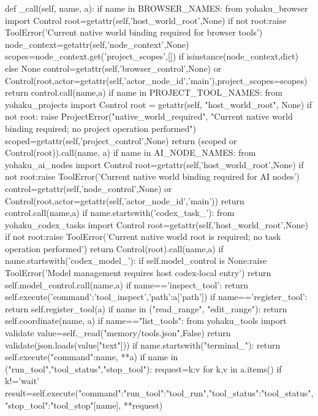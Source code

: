     def _call(self, name, a):
        if name in BROWSER_NAMES:
            from yohaku_browser import Control
            root=getattr(self,'host_world_root',None)
            if not root:raise ToolError('Current native world binding required for browser tools')
            node_context=getattr(self,'node_context',None)
            scopes=node_context.get('project_scopes',[]) if isinstance(node_context,dict) else None
            control=getattr(self,'browser_control',None) or Control(root,actor=getattr(self,'actor_node_id','main'),project_scopes=scopes)
            return control.call(name,a)
        if name in PROJECT_TOOL_NAMES:
            from yohaku_projects import Control
            root = getattr(self, "host_world_root", None)
            if not root:
                raise ProjectError("native_world_required", "Current native world binding required; no project operation performed")
            scoped=getattr(self,'project_control',None)
            return (scoped or Control(root)).call(name, a)
        if name in AI_NODE_NAMES:
            from yohaku_ai_nodes import Control
            root=getattr(self,'host_world_root',None)
            if not root:raise ToolError('Current native world binding required for AI nodes')
            control=getattr(self,'node_control',None) or Control(root,actor=getattr(self,'actor_node_id','main'))
            return control.call(name,a)
        if name.startswith('codex_task_'):
            from yohaku_codex_tasks import Control
            root=getattr(self,'host_world_root',None)
            if not root:raise ToolError('Current native world root is required; no task operation performed')
            return Control(root).call(name,a)
        if name.startswith('codex_model_'):
            if self.model_control is None:raise ToolError('Model management requires host codex-local entry')
            return self.model_control.call(name,a)
        if name=='inspect_tool':
            return self.execute({'command':'tool_inspect','path':a['path']})
        if name=='register_tool':
            return self.register_tool(a)
        if name in ("read_range", "edit_range"):
            return self.coordinate(name, a)
        if name=="list_tools":
            from yohaku_tools import validate
            value=self._read("memory/tools.json",False)
            return validate(json.loads(value["text"]))
        if name.startswith("terminal_"):
            return self.execute({"command":name, **a})
        if name in ("run_tool","tool_status","stop_tool"):
            request={k:v for k,v in a.items() if k!='wait'}
            result=self.execute({"command":{"run_tool":"tool_run","tool_status":"tool_status","stop_tool":"tool_stop"}[name], **request})

